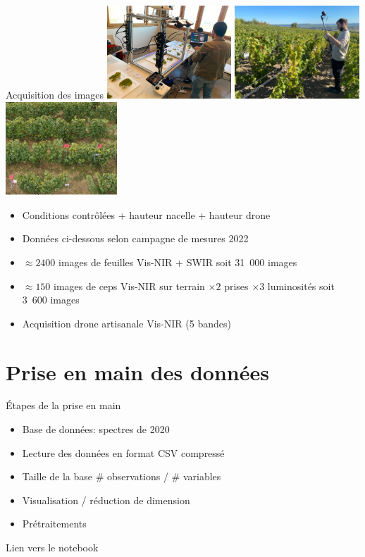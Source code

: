 \documentclass[presentation, aspectratio=169]{beamer}
\begin{document}
\begin{frame}{Acquisition des images}
  \includegraphics[height=35mm]{dispositif}
  \hfill
  \includegraphics[height=35mm]{champs}  
  \hfill
  \includegraphics[height=35mm]{drone}
  \begin{itemize}
  \item Conditions contrôlées + hauteur nacelle + hauteur drone
  \item Données ci-dessous selon campagne de mesures 2022
  \item $\approx2400$ images de feuilles Vis-NIR + SWIR soit 31\ 000
    images
  \item $\approx150$ images de ceps Vis-NIR sur terrain $\times2$
    prises $\times3$ luminosités soit 3\ 600 images
  \item Acquisition drone artisanale Vis-NIR (5 bandes)
  \end{itemize}
\end{frame}


\section{Prise en main des données}

\begin{frame}{Étapes de la prise en main}
  \begin{itemize}
  \item Base de données: spectres de 2020
  \item Lecture des données en format CSV compressé
  \item Taille de la base \# observations / \# variables
  \item Visualisation / réduction de dimension
  \item Prétraitements
  \end{itemize}

  Lien vers le notebook
\end{frame}
\end{document}
